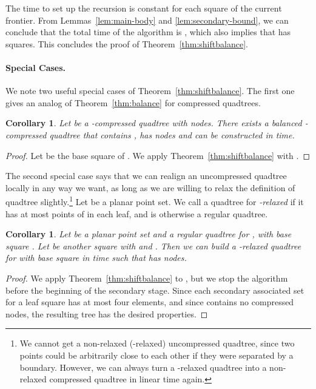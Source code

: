 \documentclass[11pt]{paper}
\newtheorem {cor}[theorem] {Corollary}
\begin{document}
      The time to set up the recursion is constant for each square of the
      current frontier. From Lemmas~\ref{lem:main-body} and 
      \ref{lem:secondary-bound}, we can conclude that the total time of
      the algorithm is , which also implies that  has 
      squares. This concludes the proof of Theorem~\ref{thm:shiftbalance}.

    \paragraph{Special Cases.}
    We note two useful special cases of Theorem~\ref{thm:shiftbalance}.
    The first one gives an analog of Theorem~\ref{thm:balance} for compressed
    quadtrees.
    \begin {cor} \label {cor:balance-'n-thread}
      Let  be a -compressed quadtree with  nodes. 
      There exists a balanced -compressed quadtree that contains ,
      has  nodes and can be constructed in  time.
    \end {cor}

   \begin{proof}
      Let  be the base square of . We apply 
      Theorem~\ref{thm:shiftbalance} with . 
   \end{proof}

    The second special case says that we can realign an uncompressed 
    quadtree locally in any way we want, as long as we are willing
    to relax the definition of quadtree slightly.\footnote
    {We cannot get a non-relaxed (-relaxed) uncompressed quadtree, since two points could be arbitrarily close to each other if they were separated by a boundary. However, we can always turn a -relaxed quadtree into a non-relaxed compressed quadtree in linear time again.}
    Let  be a planar point set.
    We call a quadtree for  \emph {-relaxed} if it has at most
     points of  in each leaf, and is otherwise a regular quadtree.
    \begin {cor} \label {cor:qt-shift}
      Let  be a planar point set and  a regular quadtree for , 
      with base square .
      Let  be another square with  and 
      .
      Then we can build a -relaxed quadtree  for  
      with base square  in  time such that
       has  nodes.      
    \end {cor}

   \begin{proof}
      We apply Theorem~\ref{thm:shiftbalance} to , but we stop the
      algorithm before the beginning of the secondary stage.
      Since each secondary associated set for a leaf square has
      at most four elements, and since  contains no compressed
      nodes, the resulting tree  has the desired properties.
   \end{proof}
\end{document}
